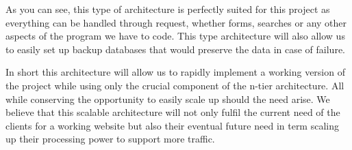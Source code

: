 As you can see, this type of architecture is perfectly suited for this
project as everything can be handled through request, whether forms, searches
or any other aspects of the program we have to code. This type architecture will
also allow us to easily set up backup databases that would preserve the
data in case of failure. \newline

In short this architecture will allow us to rapidly implement a working
version of the project while using only the crucial component of the n-tier
architecture. All while conserving the opportunity to easily scale up
should the need arise. We believe that this scalable architecture will not
only fulfil the current need of the clients for a working website but also
their eventual future need in term scaling up their processing power to
support more traffic.
